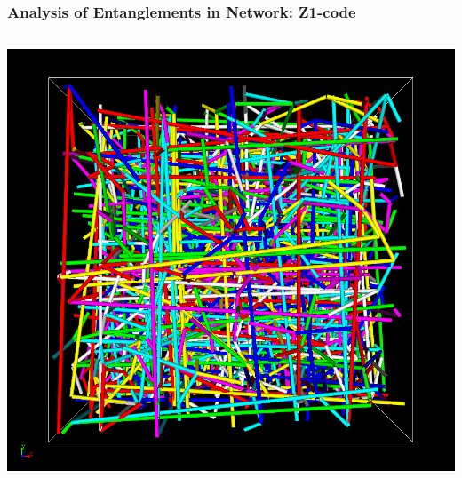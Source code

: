\documentclass[12pt, dvipdfmx]{beamer}
\begin{document}
\begin{frame}
    \frametitle{Analysis of Entanglements in Network: Z1-code}
        \vspace{-2mm}
        \begin{columns}[onlytextwidth][c]
                \includegraphics[width=\textwidth]{z_cord_4Chain.png}
				

\end{columns}
\end{frame}
\end{document}
